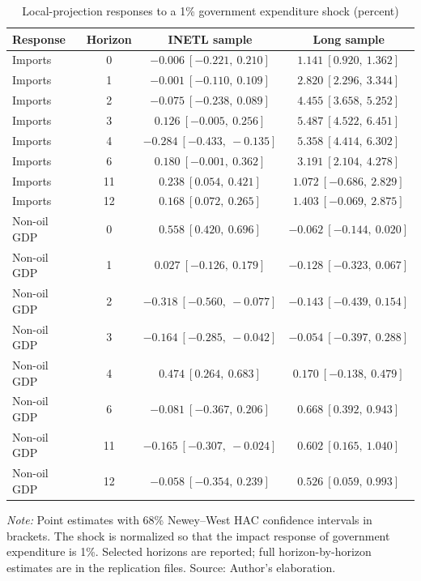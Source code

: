\documentclass[11pt,a4paper]{article}
\begin{document}
\begin{table}[htbp]
\centering
\small
\caption{Local-projection responses to a 1\% government expenditure shock (percent)}
\label{tab:lp_elasticities}
\begin{tabular}{@{}lccc@{}}
\toprule
Response & Horizon & INETL sample & Long sample \\
\midrule
Imports & 0 & $-0.006\ [-0.221,\ 0.210]$ & $1.141\ [0.920,\ 1.362]$ \\
Imports & 1 & $-0.001\ [-0.110,\ 0.109]$ & $2.820\ [2.296,\ 3.344]$ \\
Imports & 2 & $-0.075\ [-0.238,\ 0.089]$ & $4.455\ [3.658,\ 5.252]$ \\
Imports & 3 & $0.126\ [-0.005,\ 0.256]$ & $5.487\ [4.522,\ 6.451]$ \\
Imports & 4 & $-0.284\ [-0.433,\ -0.135]$ & $5.358\ [4.414,\ 6.302]$ \\
Imports & 6 & $0.180\ [-0.001,\ 0.362]$ & $3.191\ [2.104,\ 4.278]$ \\
Imports & 11 & $0.238\ [0.054,\ 0.421]$ & $1.072\ [-0.686,\ 2.829]$ \\
Imports & 12 & $0.168\ [0.072,\ 0.265]$ & $1.403\ [-0.069,\ 2.875]$ \\
Non-oil GDP & 0 & $0.558\ [0.420,\ 0.696]$ & $-0.062\ [-0.144,\ 0.020]$ \\
Non-oil GDP & 1 & $0.027\ [-0.126,\ 0.179]$ & $-0.128\ [-0.323,\ 0.067]$ \\
Non-oil GDP & 2 & $-0.318\ [-0.560,\ -0.077]$ & $-0.143\ [-0.439,\ 0.154]$ \\
Non-oil GDP & 3 & $-0.164\ [-0.285,\ -0.042]$ & $-0.054\ [-0.397,\ 0.288]$ \\
Non-oil GDP & 4 & $0.474\ [0.264,\ 0.683]$ & $0.170\ [-0.138,\ 0.479]$ \\
Non-oil GDP & 6 & $-0.081\ [-0.367,\ 0.206]$ & $0.668\ [0.392,\ 0.943]$ \\
Non-oil GDP & 11 & $-0.165\ [-0.307,\ -0.024]$ & $0.602\ [0.165,\ 1.040]$ \\
Non-oil GDP & 12 & $-0.058\ [-0.354,\ 0.239]$ & $0.526\ [0.059,\ 0.993]$ \\
\bottomrule
\end{tabular}
\par\vspace{0.3em}
\begin{minipage}{0.95\textwidth}
\footnotesize\textit{Note:} Point estimates with 68\% Newey--West HAC confidence intervals in brackets. The shock is normalized so that the impact response of government expenditure is 1\%. Selected horizons are reported; full horizon-by-horizon estimates are in the replication files. Source: Author's elaboration.
\end{minipage}
\end{table}
\end{document}
